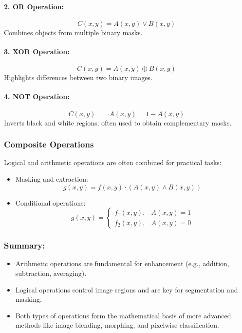 \documentclass[12pt,a4paper]{AnantDocumentation}
\begin{document}
\paragraph{2. OR Operation:}
\begin{equation}
C(x, y) = A(x, y) \lor B(x, y)
\end{equation}
Combines objects from multiple binary masks.

\paragraph{3. XOR Operation:}
\begin{equation}
C(x, y) = A(x, y) \oplus B(x, y)
\end{equation}
Highlights differences between two binary images.

\paragraph{4. NOT Operation:}
\begin{equation}
C(x, y) = \neg A(x, y) = 1 - A(x, y)
\end{equation}
Inverts black and white regions, often used to obtain complementary masks.

\subsubsection{Composite Operations}
Logical and arithmetic operations are often combined for practical tasks:
\begin{itemize}
\item Masking and extraction:
\[
g(x, y) = f(x, y) \cdot (A(x, y) \land B(x, y))
\]
\item Conditional operations:
\[
g(x, y) = 
\begin{cases}
f_1(x, y), & A(x, y) = 1 \\
f_2(x, y), & A(x, y) = 0
\end{cases}
\]
\end{itemize}

\subsubsection{Summary:}
\begin{itemize}
\item Arithmetic operations are fundamental for enhancement (e.g., addition, subtraction, averaging).
\item Logical operations control image regions and are key for segmentation and masking.
\item Both types of operations form the mathematical basis of more advanced methods like image blending, morphing, and pixelwise classification.
\end{itemize}
\end{document}
